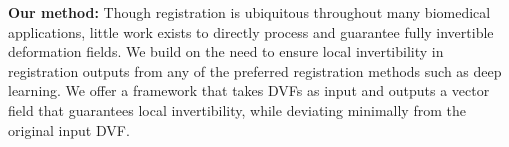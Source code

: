 \documentclass[lettersize,journal]{IEEEtran}
\begin{document}

\textbf{Our method:} 
Though registration is ubiquitous throughout many biomedical applications, little work exists to directly process and guarantee fully invertible deformation fields. We build on the need to ensure local invertibility in registration outputs from any of the preferred registration methods such as deep learning. We offer a framework that takes DVFs as input and outputs a vector field that guarantees local invertibility, while deviating minimally from the original input DVF.
\end{document}
